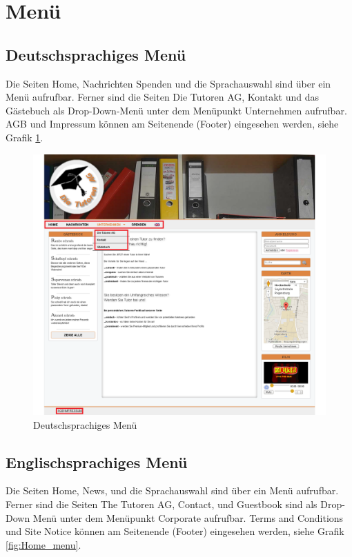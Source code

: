 
\section{Menü}

\subsection{Deutschsprachiges Menü}

Die Seiten Home, Nachrichten Spenden und die Sprachauswahl sind über ein Menü aufrufbar. Ferner sind die Seiten Die Tutoren AG, Kontakt und das Gästebuch als Drop-Down-Menü unter dem Menüpunkt Unternehmen aufrufbar. AGB und Impressum können am Seitenende (Footer) eingesehen werden, siehe Grafik \ref{fig:Startseite_menu}.

\begin{figure}[!htbp]
\centering
\includegraphics[width=1\linewidth]{../Screenshots/de/Startseite_menu}
\caption{Deutschsprachiges Menü}
\label{fig:Startseite_menu}
\end{figure}

\newpage

\subsection{Englischsprachiges Menü}

 Die Seiten Home, News, und die Sprachauswahl sind über ein Menü aufrufbar. Ferner sind die Seiten The Tutoren AG, Contact,  und Guestbook sind als Drop-Down Menü unter dem Menüpunkt Corporate aufrufbar. Terms and Conditions und Site Notice können am Seitenende (Footer) eingesehen werden, siehe Grafik \ref{fig:Home_menu}.

